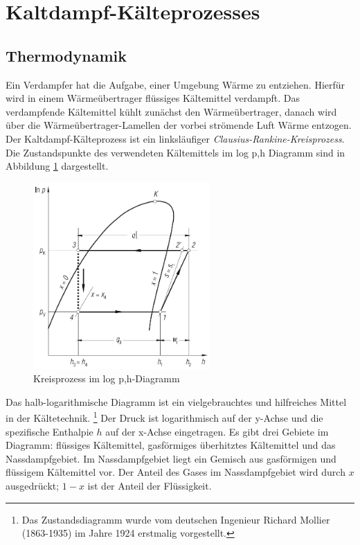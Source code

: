 \section{Kaltdampf-Kälteprozesses}
\label{sec:Thermodynamik}

\subsection*{Thermodynamik}
Ein Verdampfer hat die Aufgabe, einer Umgebung Wärme zu entziehen. Hierfür wird in einem Wärmeübertrager flüssiges Kältemittel verdampft. Das verdampfende Kältemittel kühlt zunächst den Wärmeübertrager, danach wird über die Wärmeübertrager-Lamellen der vorbei strömende Luft Wärme entzogen.
Der Kaltdampf-Kälteprozess ist ein linksläufiger \textit{Clausius-Rankine-Kreisprozess}. Die Zustandspunkte des verwendeten Kältemittels im log p,h Diagramm sind in Abbildung \ref{fig:Komponenten} dargestellt. 

\begin{figure}[htb]
\centering		
\includegraphics[width=0.6\textwidth]{Pictures/log_p_h_Beahr.png}
\caption{Kreisprozess im log p,h-Diagramm \citep{Baehr2013}}
\label{fig:Komponenten}
\end{figure}


Das halb-logarithmische Diagramm ist ein vielgebrauchtes und hilfreiches Mittel in der Kältetechnik. 
\footnote{Das Zustandsdiagramm wurde vom deutschen Ingenieur Richard Mollier (1863-1935) im Jahre 1924 erstmalig vorgestellt.} 
Der Druck ist logarithmisch auf der y-Achse und die spezifische Enthalpie $h$ auf der x-Achse eingetragen. Es gibt drei Gebiete im Diagramm: flüssiges Kältemittel, gasförmiges überhitztes Kältemittel und das Nassdampfgebiet. Im Nassdampfgebiet liegt ein Gemisch aus gasförmigen und flüssigem Kältemittel vor. Der Anteil des Gases im Nassdampfgebiet wird durch $x$ ausgedrückt; $1-x$ ist der Anteil der Flüssigkeit.


